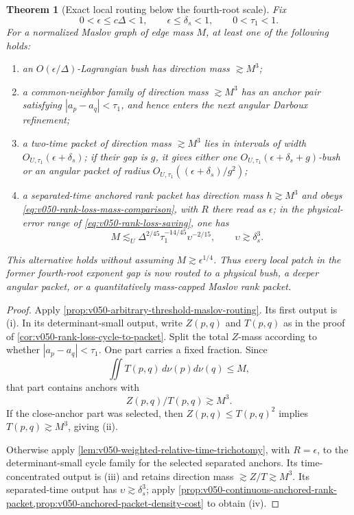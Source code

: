 \documentclass[10pt]{article}
\newtheorem{theorem}{Theorem}[section]
\begin{document}
\begin{theorem}[Exact local routing below the fourth-root scale]
\label{thm:v050-complete-local-maslov-routing}
Fix
\[
0<\epsilon\le c\Delta<1,
\qquad
\epsilon\le\delta_s<1,
\qquad
0<\tau_1<1.
\]
For a normalized Maslov graph of edge mass \(M\), at least one of the following holds:
\begin{enumerate}[label=\textnormal{(\roman*)}]
\item an \(O(\epsilon/\Delta)\)-Lagrangian bush has direction mass \(\gtrsim M^3\);
\item a common-neighbor family of direction mass \(\gtrsim M^3\) has an anchor pair satisfying
\(|a_p-a_q|<\tau_1\), and hence enters the next angular Darboux refinement;
\item a two-time packet of direction mass \(\gtrsim M^3\) lies in intervals of width
\(O_{U,\tau_1}(\epsilon+\delta_s)\); if their gap is \(g\), it gives either one
\(O_{U,\tau_1}(\epsilon+\delta_s+g)\)-bush or an angular packet of radius
\(O_{U,\tau_1}((\epsilon+\delta_s)/g^2)\);
\item a separated-time anchored rank packet has direction mass \(h\gtrsim M^3\) and obeys
\eqref{eq:v050-rank-loss-mass-comparison}, with \(R\) there read as \(\epsilon\); in the
physical-error range of
\eqref{eq:v050-rank-loss-saving}, one has
\[
M
\lesssim_U
\Delta^{2/45}\tau_1^{-14/45}\upsilon^{-2/15},
\qquad
\upsilon\gtrsim\delta_s^3.
\]
\end{enumerate}
This alternative holds without assuming \(M\gtrsim\epsilon^{1/4}\).  Thus every local patch in the
former fourth-root exponent gap is now routed to a physical bush, a deeper angular packet, or a
quantitatively mass-capped Maslov rank packet.
\end{theorem}

\begin{proof}
Apply \cref{prop:v050-arbitrary-threshold-maslov-routing}.  Its first output is
\textnormal{(i)}.  In its determinant-small output, write \(Z(p,q)\) and \(T(p,q)\) as in the proof
of \cref{cor:v050-rank-loss-cycle-to-packet}.  Split the total \(Z\)-mass according to whether
\(|a_p-a_q|<\tau_1\).  One part carries a fixed fraction.  Since
\[
\iint T(p,q)\,d\nu(p)d\nu(q)
\le M,
\]
that part contains anchors with
\[
Z(p,q)/T(p,q)
\gtrsim M^3.
\]
If the close-anchor part was selected, then \(Z(p,q)\le T(p,q)^2\) implies
\(T(p,q)\gtrsim M^3\), giving \textnormal{(ii)}.

Otherwise apply \cref{lem:v050-weighted-relative-time-trichotomy}, with \(R=\epsilon\), to the
determinant-small cycle family for the selected separated anchors.  Its time-concentrated output is
\textnormal{(iii)} and
retains direction mass \(\gtrsim Z/T\gtrsim M^3\).  Its separated-time output has
\(\upsilon\gtrsim\delta_s^3\); apply
\cref{prop:v050-continuous-anchored-rank-packet,prop:v050-anchored-packet-density-cost} to obtain
\textnormal{(iv)}.
\end{proof}
\end{document}
